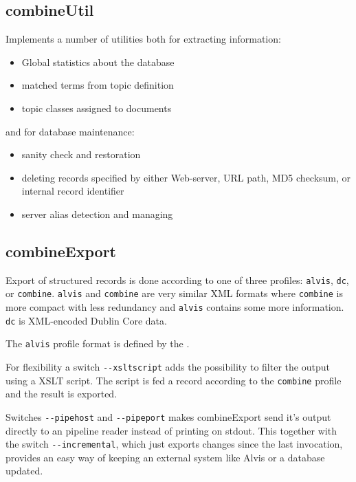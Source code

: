 \subsection{combineUtil}
Implements a number of utilities both for extracting information:
\begin{itemize}
\item Global statistics about the database

\item matched terms from topic definition

\item topic classes assigned to documents
\end{itemize}
and for database maintenance:
\begin{itemize}
\item sanity check and restoration
\item deleting records specified by either Web-server, URL path, MD5 checksum, or internal record identifier

\item server alias detection and managing
\end{itemize}

\subsection{combineExport}
Export of structured records is done according to one of three profiles: {\tt alvis},
{\tt dc}, or {\tt combine}. {\tt alvis} and {\tt combine} are
very similar XML formats where {\tt combine} is more compact with
less redundancy and
{\tt alvis} contains some more information.
{\tt dc} is XML-encoded Dublin Core data.

The {\tt alvis} profile format is defined by the  .

For flexibility a switch \verb+--xsltscript+ adds the possibility
to filter the output using a XSLT script. The script is fed
a record according to the {\tt combine} profile and the result
is exported.

Switches \verb+--pipehost+ and \verb+--pipeport+ makes combineExport send it's output directly to an
 pipeline reader instead
of printing on stdout. This together with the switch \verb+--incremental+, which just exports changes since the last invocation,
provides an easy way of keeping an external system like Alvis or a 
 database updated.

